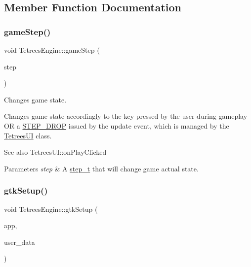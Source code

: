 \subsection{Member Function Documentation}
\mbox{\label{classTetreesEngine_a33e9983a618b3538640b6bd987304b8b}} 
\subsubsection{\texorpdfstring{game\+Step()}{gameStep()}}
{\footnotesize\ttfamily void Tetrees\+Engine\+::game\+Step (\begin{DoxyParamCaption}\item[{\hyperlink{TetreesDefs_8hpp_a4d5a793092a473f85b4c1f7faf62afed}{step\+\_\+t}}]{step }\end{DoxyParamCaption})}



Changes game state. 

Changes game state accordingly to the key pressed by the user during gameplay OR a \hyperlink{TetreesDefs_8hpp_a4d5a793092a473f85b4c1f7faf62afed}{S\+T\+E\+P\+\_\+\+D\+R\+OP} issued by the update event, which is managed by the \hyperlink{classTetreesUI}{Tetrees\+UI} class. \begin{DoxySeeAlso}{See also}
Tetrees\+U\+I\+::on\+Play\+Clicked 
\end{DoxySeeAlso}

\begin{DoxyParams}{Parameters}
{\em step} & A \hyperlink{TetreesDefs_8hpp_a4d5a793092a473f85b4c1f7faf62afed}{step\+\_\+t} that will change game actual state. \\
\hline
\end{DoxyParams}
\mbox{\label{classTetreesEngine_a85e0da200fb3e17745f1978d24acca2f}} 
\subsubsection{\texorpdfstring{gtk\+Setup()}{gtkSetup()}}
{\footnotesize\ttfamily void Tetrees\+Engine\+::gtk\+Setup (\begin{DoxyParamCaption}\item[{Gtk\+Application $\ast$}]{app,  }\item[{gpointer}]{user\+\_\+data }\end{DoxyParamCaption})}




